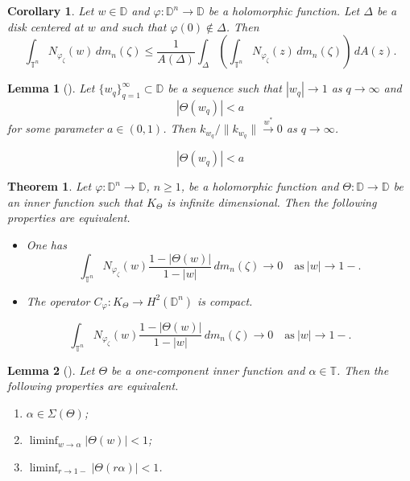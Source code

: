 \documentclass[10pt,a4paper]{amsart}
\newtheorem{corollary}{Corollary}
\newtheorem{lemma}{Lemma}
\newtheorem{theorem}{Theorem}
\newcommand{\Dbb}{\mathbb D}
\newcommand{\Tbb}{\mathbb T}
\newcommand{\al}{\alpha}
\newcommand{\aream}{A}
\newcommand{\bneva}{\mathcal{N}}
\newcommand{\cph}{C_\varphi}
\newcommand{\diin}{\Theta}
\newcommand{\dn}{\mathbb{D}^n}
\newcommand{\knl}{k}
\newcommand{\meal}{m_n}
\newcommand{\neva}{N}
\newcommand{\ph}{\varphi}
\newcommand{\spr}{\Sigma}
\newcommand{\tn}{\mathbb{T}^n}
\newcommand{\za}{\zeta}
\begin{document}
\begin{corollary}\label{c_subharm}
Let $w\in\Dbb$ and $\ph: \dn\to\Dbb$ be a holomorphic function.
Let $\Delta$ be a disk centered at $w$ and such that $\ph(0)\notin \Delta$.
Then
\begin{equation}\label{e_subharm}
\int_{\tn} \neva_{\ph_\za}(w)\,d\meal(\za) \le \frac{1}{\aream(\Delta)}\int_{\Delta}
\left(\int_{\tn} \neva_{\ph_\za}(z)\,  d\meal(\za) \right)\, d\aream(z).
\end{equation}
\end{corollary}

\begin{lemma}[{\cite[Lemma~1]{LM13}}]\label{l_LM}
Let $\{w_q\}_{q=1}^\infty \subset\Dbb$ be a sequence such that $|w_q|\to 1$ as $q\to \infty$ and
\begin{equation}\label{e_LM}
|\diin (w_q)| < a
\end{equation}
for some parameter $a\in (0,1)$. Then
$\knl_{w_q}/\|\knl_{w_q}\| \overset{w^\ast}\longrightarrow 0$ as $q\to \infty$.
\end{lemma}

\begin{equation}
|\diin (w_q)| < a
\end{equation}

\begin{theorem}\label{t_cph_tri}
Let $\ph: \dn\to\Dbb$, $n\ge 1$, be a holomorphic function and $\diin: \Dbb \to \Dbb$ be an inner function
such that $K_\diin$ is infinite dimensional.
Then the following properties are equivalent.
\begin{itemize}
  \item [(i)] One has
  \begin{equation}\label{e_nevaTo0}
\int_{\tn}\neva_{\ph_\za}(w) \frac{1-|\diin(w)|}{1-|w|}\, d\meal(\za)\to 0 \quad \textrm{as}\ |w|\to 1-.
\end{equation}
  \item [(ii)] The operator $\cph: K_\diin \to H^2(\dn)$ is compact.
\end{itemize}
\end{theorem}

  \begin{equation}
\int_{\tn}\neva_{\ph_\za}(w) \frac{1-|\diin(w)|}{1-|w|}\, d\meal(\za)\to 0 \quad \textrm{as}\ |w|\to 1-.
\end{equation}

\begin{lemma}[{\cite[Section~5]{VT88}}]\label{l_A}
Let $\diin$ be a one-component inner function and $\al\in\Tbb$. Then the following properties are equivalent.
\begin{enumerate}
  \item[$\bullet$] $\al\in\spr(\diin)$;
  \item[$\bullet$] $\liminf_{w\to\al} |\diin(w)| <1$;
  \item[$\bullet$] $\liminf_{r\to 1-} |\diin(r\al)| <1$.
\end{enumerate}
\end{lemma}
\end{document}
